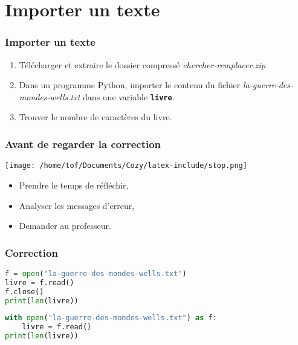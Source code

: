 \documentclass[svgnames,11pt]{beamer}
\begin{document}
\section{Importer un texte}
\begin{frame}
    \frametitle{Importer un texte}

    \begin{activite}
    \begin{enumerate}
        \item Télécharger et extraire le dossier compressé \emph{chercher-remplacer.zip}
        \item Dans un programme Python, importer le contenu du fichier \emph{la-guerre-des-mondes-wells.txt} dans une variable \textbf{\texttt{livre}}.
        \item Trouver le nombre de caractères du livre.
    \end{enumerate}
    \end{activite}

\end{frame}
\begin{frame}
    \frametitle{Avant de regarder la correction}
\begin{center}
    \centering
    \texttt{[image: /home/tof/Documents/Cozy/latex-include/stop.png]}
    \end{center}
{\Large
    \begin{itemize}
        \item Prendre le temps de réfléchir,
        \item Analyser les messages d'erreur,
        \item Demander au professeur.
    \end{itemize}
}
\end{frame}
\begin{frame}[fragile]
    \frametitle{Correction}

    \begin{center}
    \begin{lstlisting}[language=Python , basicstyle=\small, xleftmargin=2em, xrightmargin=2em]
f = open("la-guerre-des-mondes-wells.txt")
livre = f.read()
f.close()
print(len(livre))
\end{lstlisting}
    \label{importer}
    \end{center}

 \begin{center}
    \begin{lstlisting}[language=Python , basicstyle=\small, xleftmargin=2em, xrightmargin=2em]
with open("la-guerre-des-mondes-wells.txt") as f:
    livre = f.read()
print(len(livre))
\end{lstlisting}
    \label{importer2}
    \end{center}
\end{frame}
\end{document}
